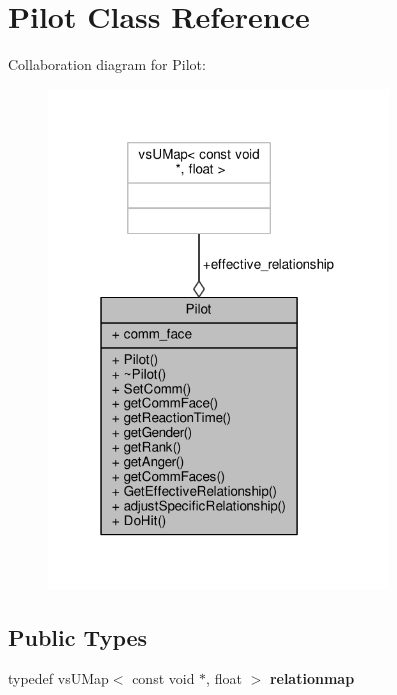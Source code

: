 \hypertarget{classPilot}{}\section{Pilot Class Reference}
\label{classPilot}


Collaboration diagram for Pilot\+:
\nopagebreak
\begin{figure}[H]
\begin{center}
\leavevmode
\includegraphics[width=256pt]{d0/d44/classPilot__coll__graph}
\end{center}
\end{figure}
\subsection*{Public Types}
\begin{DoxyCompactItemize}
\item 
typedef vs\+U\+Map$<$ const void $\ast$, float $>$ {\bfseries relationmap}\hypertarget{classPilot_a6b7f2338f0db3dad446ae21ffe181140}{}\label{classPilot_a6b7f2338f0db3dad446ae21ffe181140}

\end{DoxyCompactItemize}
